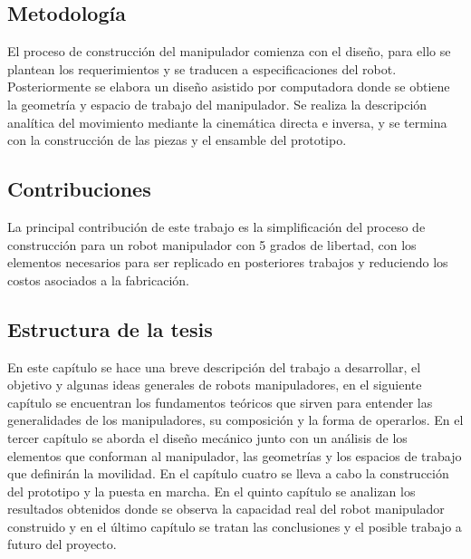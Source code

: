 \subsection{Metodología}

El proceso de construcción del manipulador comienza con el diseño, para ello se plantean los requerimientos y se traducen a especificaciones del robot. Posteriormente se elabora un diseño asistido por computadora donde se obtiene la geometría y espacio de trabajo del manipulador. Se realiza la descripción analítica del movimiento mediante la cinemática directa e inversa, y se termina con la construcción de las piezas y el ensamble del prototipo.


\subsection{Contribuciones}

La principal contribución de este trabajo es la simplificación del proceso de construcción para un robot manipulador con 5 grados de libertad, con los elementos necesarios para ser replicado en posteriores trabajos y reduciendo los costos asociados a la fabricación.


\subsection{Estructura de la tesis}

En este capítulo se hace una breve descripción del trabajo a desarrollar, el objetivo y algunas ideas generales de robots manipuladores, en el siguiente capítulo se encuentran los fundamentos teóricos que sirven para entender las generalidades de los manipuladores, su composición y la forma de operarlos. En el tercer capítulo se aborda el diseño mecánico junto con un análisis de los elementos que conforman al manipulador, las geometrías y los espacios de trabajo que definirán la movilidad. En el capítulo cuatro se lleva a cabo la construcción del prototipo y la puesta en marcha. En el quinto capítulo se analizan los resultados obtenidos donde se observa la capacidad real del robot manipulador construido y en el último capítulo se tratan las conclusiones y el posible trabajo a futuro del proyecto.

